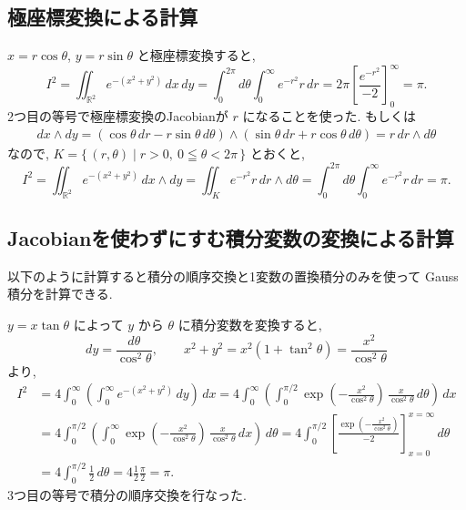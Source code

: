 \documentclass[12pt,twoside]{jarticle}
\newcommand\R{{\mathbb R}} %
\theoremstyle{jplain}
\theoremstyle{jplain}
\theoremstyle{jplain}
\numberwithin{theorem}{section}
\numberwithin{equation}{section}
\numberwithin{figure}{section}
\numberwithin{table}{section}
\begin{document}
\subsection{極座標変換による計算}

$x=r\cos\theta$, $y=r\sin\theta$ と極座標変換すると,
\[
I^2
=\iint_{\R^2} e^{-(x^2+y^2)}\,dx\,dy
=\int_0^{2\pi}d\theta \int_0^\infty e^{-r^2}r \,dr
=2\pi\left[\frac{e^{-r^2}}{-2}\right]_0^\infty
=\pi.
\]
2つ目の等号で極座標変換のJacobianが $r$ になることを使った.
もしくは
\begin{align*}
dx\wedge dy
=(\cos\theta\,dr-r\sin\theta\,d\theta)\wedge
 (\sin\theta\,dr+r\cos\theta\,d\theta)
=r\,dr\wedge d\theta
\end{align*}
なので, $K=\{\,(r,\theta)\mid r>0,\ 0\leqq\theta<2\pi\,\}$ とおくと,
\[
I^2
=\iint_{\R^2} e^{-(x^2+y^2)}\,dx\wedge dy
=\iint_K e^{-r^2}r \,dr\wedge d\theta
=\int_0^{2\pi}d\theta \int_0^\infty e^{-r^2}r \,dr
=\pi.
\]


\subsection{Jacobianを使わずにすむ積分変数の変換による計算}
\label{sec:y=xt}

以下のように計算すると積分の順序交換と1変数の置換積分のみを使って
Gauss積分を計算できる.

$y=x\tan\theta$ によって $y$ から $\theta$ に積分変数を変換すると,
\[
dy = \frac{d\theta}{\cos^2\theta}, \qquad
x^2+y^2=x^2(1+\tan^2\theta) = \frac{x^2}{\cos^2\theta}
\]
より,
\begin{align*}
I^2
&=4
\int_0^\infty
\left(
\int_0^\infty e^{-(x^2+y^2)}\,dy
\right)\,dx
=4
\int_0^\infty
\left(
\int_0^{\pi/2} \exp\left(-\frac{x^2}{\cos^2\theta}\right)\,\frac{x}{\cos^2\theta}\,d\theta
\right)\,dx
\\ &
=4
\int_0^{\pi/2}
\left(
\int_0^\infty \exp\left(-\frac{x^2}{\cos^2\theta}\right)\,\frac{x}{\cos^2\theta}\,dx
\right)\,d\theta
=4
\int_0^{\pi/2}
\left[
\frac{\exp\left(-\frac{x^2}{\cos^2\theta}\right)}{-2}
\right]_{x=0}^{x=\infty}
\,d\theta
\\ &
=4
\int_0^{\pi/2}\frac{1}{2}\,d\theta
=4\frac{1}{2}\frac{\pi}{2}
=\pi.
\end{align*}
3つ目の等号で積分の順序交換を行なった.
\end{document}
